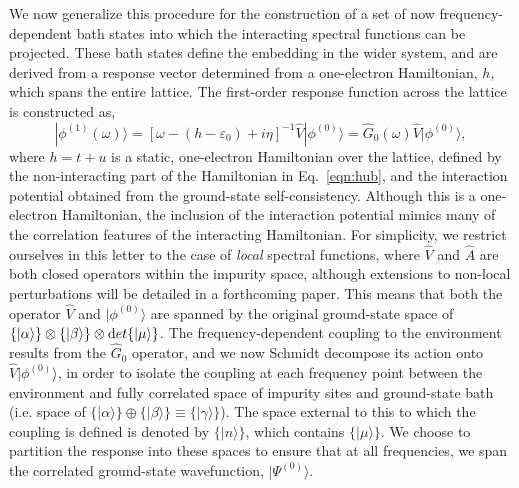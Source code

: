 \documentclass[aps,showpacs,twocolumn,nobibnotes]{revtex4}
\begin{document}
We now generalize this procedure for the construction of a set of now frequency-dependent bath states into which the interacting
spectral functions can be projected. These bath states define the embedding in the wider system, and are derived from
a response vector determined from a one-electron Hamiltonian, $h$, which spans the entire lattice.
The first-order response function across the lattice is constructed as,
\begin{equation}
|\phi^{(1)}(\omega) \rangle = \left[ \omega-(h-\varepsilon_0)+i\eta \right]^{-1} {\hat V} |\phi^{(0)}\rangle = 
    {\hat G_0}(\omega) {\hat V} |\phi^{(0)} \rangle  , \label{nonintGF}
\end{equation}
where $h = t + u$ is a static, one-electron Hamiltonian over the lattice, defined by the non-interacting part of the Hamiltonian 
in Eq.~\ref{eqn:hub}, and the interaction potential obtained from the ground-state self-consistency. 
Although this is a one-electron Hamiltonian, the inclusion of the interaction potential mimics many of the correlation features of the interacting Hamiltonian.
For simplicity, we restrict ourselves in this letter to the case of {\em local} spectral functions, where ${\hat V}$ and ${\hat A}$ are both closed operators
within the impurity space, although extensions to non-local perturbations will be detailed in a forthcoming paper. This means that both the operator 
${\hat V}$ and $|\phi^{(0)} \rangle$ are spanned by the original ground-state 
space of $\{ |\alpha \rangle \} \otimes \{ |\beta \rangle \} \otimes {\textrm det} \{ | \mu \rangle \}$. The frequency-dependent coupling to the environment 
results from the ${\hat G_0}$ operator, and we now Schmidt decompose its action onto ${\hat V} |\phi^{(0)} \rangle$, in order to isolate 
the coupling at each frequency point between the environment and fully correlated space of impurity sites and ground-state bath (i.e. 
space of $\{|\alpha \rangle \} \oplus \{|\beta \rangle \} \equiv \{ | \gamma \rangle \}$). The space external to this to which the coupling is defined 
is denoted by $\{| n \rangle \}$, which contains $\{ | \mu \rangle \}$. We choose to partition the response into these spaces to ensure that at all 
frequencies, we span the correlated ground-state wavefunction, $|\Psi^{(0)} \rangle$.
\end{document}
